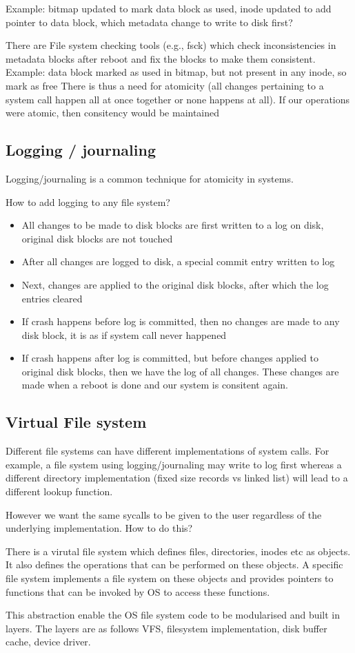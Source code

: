 \documentclass[12pt]{article}
\begin{document}
Example: bitmap updated to mark data block as used, inode updated to add pointer to data
block, which metadata change to write to disk first?


There are File system checking tools (e.g., fsck) which check inconsistencies in metadata blocks
after reboot and fix the blocks to make them consistent.
Example: data block marked as used in bitmap, but not present in any inode, so mark as free
There is thus a need for atomicity (all changes pertaining to a system call happen all at once
together or none happens at all). If our operations were atomic, then consitency would be maintained

\subsection{Logging / journaling}
Logging/journaling is a common technique for atomicity in systems.
 
How to add logging to any file system?
\begin{itemize}[itemsep = 0cm, topsep = 0cm, parsep = 0cm]
\item All changes to be made to disk blocks are first written to a log on disk, original
disk blocks are not touched
\item  After all changes are logged to disk, a special commit entry written to log
\item  Next, changes are applied to the original disk blocks, after which the log entries cleared
\item  If crash happens before log is committed, then no changes are made to any
disk block, it is as if system call never happened
\item If crash happens after log is committed, but before changes applied to original
disk blocks, then we have the log of all changes. These changes are made when a reboot is done and our system is consitent again. 


\end{itemize}
\subsection{Virtual File system}
Different file systems can have different implementations of system calls. For example, a file system using logging/journaling may write to log first whereas a different directory implementation (fixed size records vs linked list) will lead to a
different lookup function.

However we want the same sycalls to be given to the user regardless of the underlying implementation. How to do this?

There is a virutal file system which defines files, directories, inodes etc as objects. It also defines the operations that can be performed on these objects. 
A specific file system implements a file system on these objects and provides pointers to functions that can be invoked by OS to access these functions. 

This abstraction enable the OS file system code to be modularised and built in layers. The layers are as follows VFS, filesystem
implementation, disk buffer cache, device driver.
\end{document}
